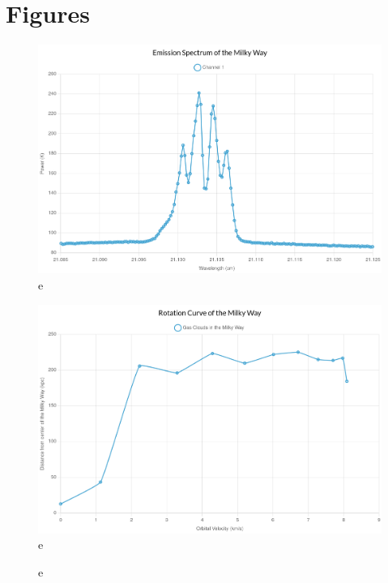 \documentclass{article}
\begin{document}
\section{Figures}
\begin{center}
    \begin{figure}[h!bt]
        \caption{
            e
            \smallskip
        }
        \includegraphics[scale=0.1]{emission-graph-lab9.jpg}
        \centering
    \end{figure}
    \begin{figure}[h!bt]
        \caption{
            e
            \smallskip
        }
        \includegraphics[scale=0.1]{rotation-curve-lab9.jpg}
        \centering
    \end{figure}
    \begin{figure}[h!bt]
        \caption{
            e
            \smallskip
        }

\end{figure}
\end{center}
\end{document}
